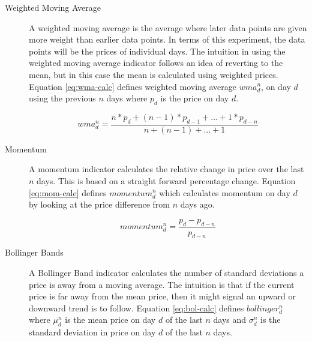 \documentclass{report}
\begin{document}
\begin{description}
  \item[Weighted Moving Average] A weighted moving average is the average where later data points are given more weight than earlier data points. In terms of this experiment, the data points will be the prices of individual days. The intuition in using the weighted moving average indicator follows an idea of reverting to the mean, but in this case the mean is calculated using weighted prices. Equation \ref{eq:wma-calc} defines weighted moving average  $wma^{n}_{d}$, on day $d$ using the previous $n$ days where $p_{d}$ is the price on day $d$.
 
  \begin{figure}[H]
  \begin{center}
      \begin{equation}
        wma^{n}_{d} = \dfrac{n * p_{d} + (n - 1) * p_{d-1} + ... + 1 * p_{d-n}} {n + (n - 1) + ... + 1}
        \label{eq:wma-calc}
      \end{equation}
  \end{center}
  \end{figure} 
    
  \item[Momentum]
  A momentum indicator calculates the relative change in price over the last $n$ days. This is based on a straight forward percentage change. Equation \ref{eq:mom-calc} defines $momentum^{n}_{d}$ which calculates momentum on day $d$ by looking at the price difference from $n$ days ago.
  
  \begin{figure}[H]
  \begin{center}
      \begin{equation}
        momentum^{n}_{d} = \dfrac{p_{d} - p_{d-n}} {p_{d-n}}
        \label{eq:mom-calc}
      \end{equation}
  \end{center}
  \end{figure}  
    
  \item[Bollinger Bands]
  A Bollinger Band indicator calculates the number of standard deviations a price is away from a moving average. The intuition is that if the current price is far away from the mean price, then it might signal an upward or downward trend is to follow. Equation \ref{eq:bol-calc} defines $bollinger^{n}_{d}$ where $\mu^{n}_{d}$ is the mean price on day $d$ of the last $n$ days and $\sigma^{n}_{d}$ is the standard deviation in price on day $d$ of the last $n$ days.
  

\end{description}
\end{document}

